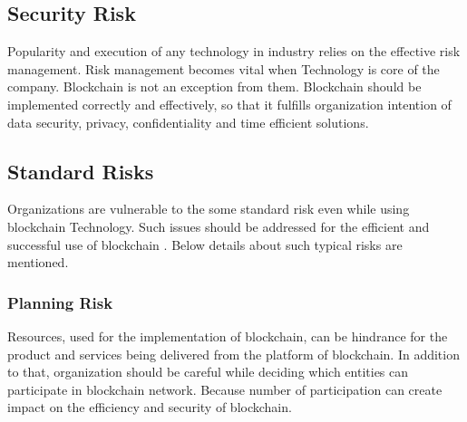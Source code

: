 \documentclass[a4paper,twoside,12pt]{report}
\begin{document}
\begin{spacing}{1.5}
\section{Security Risk}
Popularity and execution of any technology in industry relies on the effective risk management. Risk management becomes vital when Technology is core of the company. Blockchain is not an exception from them. Blockchain should be implemented correctly and effectively, so that it fulfills organization intention of data security, privacy, confidentiality and time efficient solutions.
\subsection{Standard Risks}
Organizations are vulnerable to the some standard risk even while using blockchain Technology. Such issues should be addressed for the efficient and successful use of blockchain \cite{securityrisk}. Below details about such typical risks are mentioned. 
\subsubsection{Planning Risk}
Resources, used for the implementation of blockchain, can be hindrance for the product and services being delivered from the platform of blockchain. In addition to that, organization should be careful while deciding which entities can participate in blockchain network. Because number of participation can create impact on the efficiency and security of blockchain.    

\end{spacing}
\end{document}
